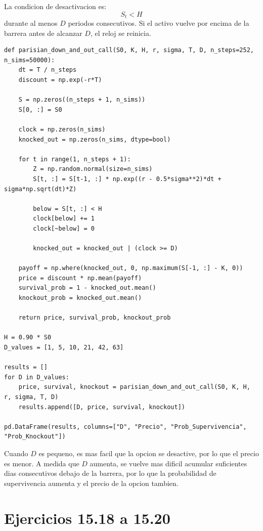 \documentclass[12pt,a4paper]{article}
\begin{document}
\begin{latexcell}
La condicion de desactivacion es:
\[
S_t < H
\]
durante al menos \(D\) periodos consecutivos.
Si el activo vuelve por encima de la barrera antes de alcanzar \(D\), el reloj se reinicia.
\end{latexcell}

\begin{lstlisting}[style=pythonstyle]
def parisian_down_and_out_call(S0, K, H, r, sigma, T, D, n_steps=252, n_sims=50000):
    dt = T / n_steps
    discount = np.exp(-r*T)

    S = np.zeros((n_steps + 1, n_sims))
    S[0, :] = S0

    clock = np.zeros(n_sims)
    knocked_out = np.zeros(n_sims, dtype=bool)

    for t in range(1, n_steps + 1):
        Z = np.random.normal(size=n_sims)
        S[t, :] = S[t-1, :] * np.exp((r - 0.5*sigma**2)*dt + sigma*np.sqrt(dt)*Z)

        below = S[t, :] < H
        clock[below] += 1
        clock[~below] = 0

        knocked_out = knocked_out | (clock >= D)

    payoff = np.where(knocked_out, 0, np.maximum(S[-1, :] - K, 0))
    price = discount * np.mean(payoff)
    survival_prob = 1 - knocked_out.mean()
    knockout_prob = knocked_out.mean()

    return price, survival_prob, knockout_prob

H = 0.90 * S0
D_values = [1, 5, 10, 21, 42, 63]

results = []
for D in D_values:
    price, survival, knockout = parisian_down_and_out_call(S0, K, H, r, sigma, T, D)
    results.append([D, price, survival, knockout])

pd.DataFrame(results, columns=["D", "Precio", "Prob_Supervivencia", "Prob_Knockout"])
\end{lstlisting}

\begin{interpretacion}
Cuando \(D\) es pequeno, es mas facil que la opcion se desactive, por lo que el precio es menor. A medida que \(D\) aumenta, se vuelve mas dificil acumular suficientes dias consecutivos debajo de la barrera, por lo que la probabilidad de supervivencia aumenta y el precio de la opcion tambien.
\end{interpretacion}

\section{Ejercicios 15.18 a 15.20}
\end{document}
